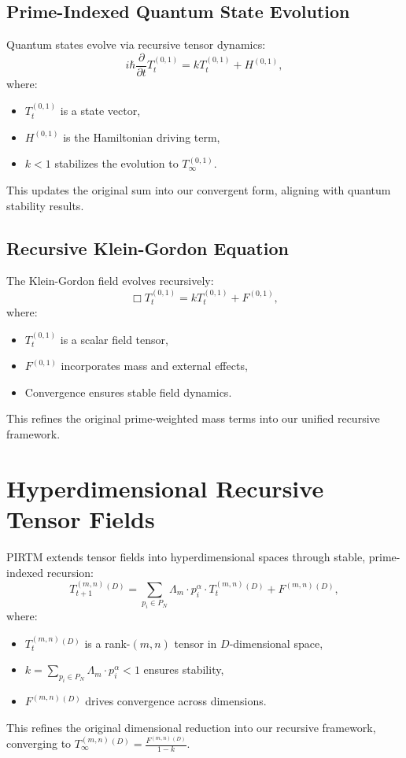 \documentclass{article}
\theoremstyle{plain}
\begin{document}
\subsection{Prime-Indexed Quantum State Evolution}
Quantum states evolve via recursive tensor dynamics:
\begin{equation}
    i\hbar \frac{\partial}{\partial t} T_t^{(0,1)} = k T_t^{(0,1)} + H^{(0,1)},
\end{equation}
where:
\begin{itemize}
    \item \( T_t^{(0,1)} \) is a state vector,
    \item \( H^{(0,1)} \) is the Hamiltonian driving term,
    \item \( k < 1 \) stabilizes the evolution to \( T_\infty^{(0,1)} \).
\end{itemize}
This updates the original sum into our convergent form, aligning with quantum stability results.

\subsection{Recursive Klein-Gordon Equation}
The Klein-Gordon field evolves recursively:
\begin{equation}
    \Box T_t^{(0,1)} = k T_t^{(0,1)} + F^{(0,1)},
\end{equation}
where:
\begin{itemize}
    \item \( T_t^{(0,1)} \) is a scalar field tensor,
    \item \( F^{(0,1)} \) incorporates mass and external effects,
    \item Convergence ensures stable field dynamics.
\end{itemize}
This refines the original prime-weighted mass terms into our unified recursive framework.

\section{Hyperdimensional Recursive Tensor Fields}
PIRTM extends tensor fields into hyperdimensional spaces through stable, prime-indexed recursion:
\begin{equation}
    T_{t+1}^{(m,n)}{}^{(D)} = \sum_{p_i \in P_N} \Lambda_m \cdot p_i^\alpha \cdot T_t^{(m,n)}{}^{(D)} + F^{(m,n)}{}^{(D)},
\end{equation}
where:
\begin{itemize}
    \item \( T_t^{(m,n)}{}^{(D)} \) is a rank-$(m,n)$ tensor in \( D \)-dimensional space,
    \item \( k = \sum_{p_i \in P_N} \Lambda_m \cdot p_i^\alpha < 1 \) ensures stability,
    \item \( F^{(m,n)}{}^{(D)} \) drives convergence across dimensions.
\end{itemize}
This refines the original dimensional reduction into our recursive framework, converging to \( T_\infty^{(m,n)}{}^{(D)} = \frac{F^{(m,n)}{}^{(D)}}{1 - k} \).
\end{document}
